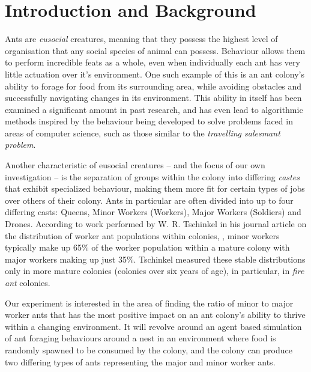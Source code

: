 \section{Introduction and Background}
		
    Ants are \textit{eusocial} creatures, meaning that they possess the highest level of organisation that any social species of animal can possess\cite{wilson_insect_1971, hadley_what_nodate}. Behaviour allows them to perform
    incredible feats as a whole, even when individually each ant has very little actuation over it's environment. One such example of this is an ant colony's ability to forage for food from its surrounding area, while avoiding
    obstacles and successfully navigating changes in its environment. This ability in itself has been examined a significant amount in past research\cite{vittori_modeling_2004, a_panait_ant_2004}, and has even lead to algorithmic
    methods inspired by the behaviour being developed to solve problems faced in areas of computer science, such as those similar to the \textit{travelling salesmant problem}\cite{dorigo_ant_2006, zhang_improved_2007}.

    Another characteristic of eusocial creatures -- and the focus of our own investigation -- is the separation of groups within the colony into differing \textit{castes} that exhibit specialized behaviour, making them more fit
    for certain types of jobs over others of their colony\cite{hadley_what_nodate}. Ants in particular are often divided into up to four differing casts: Queens, Minor Workers (Workers), Major Workers (Soldiers) and Drones\cite{noauthor_ant_nodate,noauthor_castes_nodate}.
    According to work performed by W. R. Tschinkel in his journal article on the distribution of worker ant populations within colonies, \cite{Tschinkel1988}, minor workers typically make up 65\% of the worker population within a mature colony with major workers making up just 35\%. Tschinkel measured these stable distributions only in more mature
    colonies (colonies over six years of age), in particular, in \textit{fire ant} colonies.

    Our experiment is interested in the area of finding the ratio of minor to major worker ants that has the most positive impact on an ant colony's ability to thrive within a changing environment. It will
    revolve around an agent based simulation of ant foraging behaviours around a nest in an environment where food is randomly spawned to be consumed by the colony, and the colony can produce two differing types of ants
    representing the major and minor worker ants.

